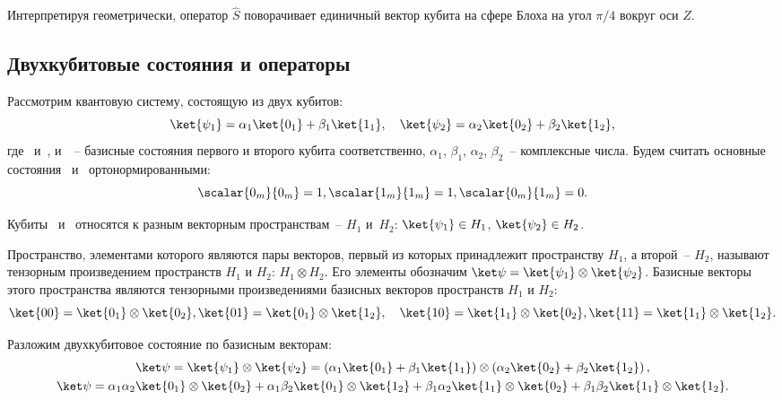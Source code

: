 \documentclass[pscyr,notitlepage]{hedwork}
\renewcommand{\~}[1]{\widetilde{#1}}
\newcommand{\lb}{\left(}
\newcommand{\rb}{\right)}
\begin{document}
  Интерпретируя геометрически, оператор \( \hat{S} \) поворачивает единичный
  вектор кубита на сфере Блоха на угол \( \pi / 4 \) вокруг оси
  \( Z \).~\cite{main}
  
  \subsection{Двухкубитовые состояния и операторы}
  Рассмотрим квантовую систему, состоящую из двух кубитов:
  \begin{equation}
    \ket{\psi_1} = \alpha_1\ket{0_1} + \beta_1\ket{1_1}, \quad
      \ket{\psi_2} = \alpha_2\ket{0_2} + \beta_2\ket{1_2},
    \label{eq:3.1}
  \end{equation}
  где~ и~,  и~~-- базисные состояния
  первого и второго кубита соответственно, \( \alpha_1 \), \( \beta_1 \),
  \( \alpha_2 \), \( \beta_2 \)~-- комплексные числа. Будем считать основные
  состояния~ и~ ортонормированными:
  \[
    \scalar{0_m}{0_m} = 1, \scalar{1_m}{1_m} = 1, \scalar{0_m}{1_m} = 0.
  \]
  
  
  Кубиты~ и~ относятся к разным векторным
  пространствам~-- \( H_1 \) и~\( H_2 \): \( \ket{\psi_1} \in H_1 \),
  \( \ket{\psi_2} \in H_2 \).
  
  Пространство, элементами которого являются пары векторов, первый из которых
  принадлежит пространству \( H_1 \), а второй~-- \( H_2 \), называют тензорным
  произведением пространств \( H_1 \) и \( H_2 \): \( H_1 \otimes H_2 \). Его
  элементы обозначим \( \ket\psi = \ket{\psi_1}\otimes\ket{\psi_2} \). Базисные
  векторы этого пространства являются тензорными произведениями базисных
  векторов пространств \( H_1 \) и \( H_2 \):
  \[
    \ket{00} = \ket{0_1}\otimes\ket{0_2},
      \ket{01} = \ket{0_1}\otimes\ket{1_2}, \quad
    \ket{10} = \ket{1_1}\otimes\ket{0_2},
      \ket{11} = \ket{1_1}\otimes\ket{1_2}.
  \]
  
  Разложим двухкубитовое состояние по базисным векторам:
  \begin{gather*}
    \ket\psi = \ket{\psi_1}\otimes\ket{\psi_2} =
      \lb\alpha_1\ket{0_1} + \beta_1\ket{1_1}\rb \otimes
      \lb\alpha_2\ket{0_2} + \beta_2\ket{1_2}\rb, \\
    \ket\psi = \alpha_1\alpha_2\ket{0_1}\otimes\ket{0_2} +
      \alpha_1\beta_2\ket{0_1}\otimes\ket{1_2} +
      \beta_1\alpha_2\ket{1_1}\otimes\ket{0_2} +
      \beta_1\beta_2\ket{1_1}\otimes\ket{1_2}.
  \end{gather*}
  
\end{document}
